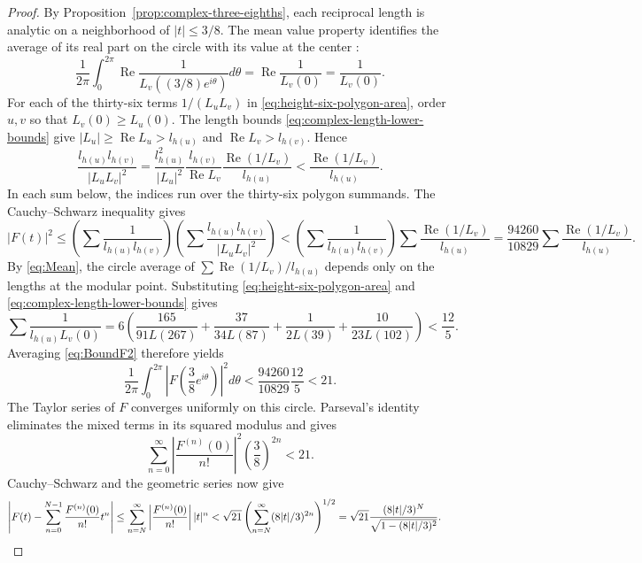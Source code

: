 \documentclass[10pt,twoside]{article}
\theoremstyle{plain}
\theoremstyle{definition}
\theoremstyle{remark}
\begin{document}
\begin{proof}
By Proposition~\ref{prop:complex-three-eighths}, each reciprocal
length is analytic on a neighborhood of $|t|\leq3/8$.
The mean value property identifies the average of its real part
on the circle with its value at the center
\cite[Corollary~7.3, p.~103]{SteinShakarchi}:
\begin{equation}
\label{eq:Mean}
\frac1{2\pi}\int_0^{2\pi}
\operatorname{Re}\frac1{L_v((3/8)e^{i\theta})}d\theta
=\operatorname{Re}\frac1{L_v(0)} = \frac1{L_v(0)}.
\end{equation}
For each of the thirty-six terms $1/(L_uL_v)$ in
\eqref{eq:height-six-polygon-area}, order $u,v$ so that
$L_v(0)\geq L_u(0)$. The length bounds \eqref{eq:complex-length-lower-bounds} give
$|L_u|\geq\operatorname{Re}L_u>l_{h(u)}$ and
$\operatorname{Re}L_v>l_{h(v)}$. Hence
$$
\frac{l_{h(u)}l_{h(v)}}{|L_uL_v|^2}
=
\frac{{l_{h(u)}^2}}{|L_u|^2}
\frac{l_{h(v)}}{\operatorname{Re}L_v}
\frac{\operatorname{Re}(1/L_v)}{l_{h(u)}}
<
\frac{\operatorname{Re}(1/L_v)}{l_{h(u)}}.
$$
In each sum below, the indices run over the thirty-six polygon
summands. The Cauchy--Schwarz inequality gives
\begin{equation}\label{eq:BoundF2}
|F(t)|^2
\leq
\left(\sum\frac1{l_{h(u)}l_{h(v)}}\right)
\left(\sum\frac{l_{h(u)}l_{h(v)}}{|L_uL_v|^2}\right)<
\left(\sum\frac1{l_{h(u)}l_{h(v)}}\right)
\sum\frac{\operatorname{Re}(1/L_v)}{l_{h(u)}}=\frac{94260}{10829}
\sum\frac{\operatorname{Re}(1/L_v)}{l_{h(u)}}.
\end{equation}
By \eqref{eq:Mean}, the circle average of
$\sum \operatorname{Re}(1/L_v)/l_{h(u)}$ depends only on the lengths
at the modular point. Substituting
\eqref{eq:height-six-polygon-area} and
\eqref{eq:complex-length-lower-bounds} gives
$$
\sum\frac1{l_{h(u)}L_v(0)}
=6\left(
\frac{165}{91L(267)}+\frac{37}{34L(87)}
+\frac1{2L(39)}+\frac{10}{23L(102)}
\right)<\frac{12}{5}.
$$
Averaging \eqref{eq:BoundF2} therefore yields
$$
\frac1{2\pi}\int_0^{2\pi}
\left|F\left(\frac38e^{i\theta}\right)\right|^2d\theta
<\frac{94260}{10829}\frac{12}{5}<21.
$$
The Taylor series of $F$ converges uniformly on this circle.
Parseval's identity eliminates the mixed terms in its squared
modulus and gives
$$
\sum_{n=0}^{\infty}
\left|\frac{F^{(n)}(0)}{n!}\right|^2
\left(\frac38\right)^{2n}<21.
$$
Cauchy--Schwarz and the geometric series now give
\begin{equation*}
\begin{aligned}
\left|F(t)-\sum_{n=0}^{N-1}\frac{F^{(n)}(0)}{n!}t^n\right|
&\leq\sum_{n=N}^{\infty}
\left|\frac{F^{(n)}(0)}{n!}\right||t|^n<\sqrt{21}
\left(\sum_{n=N}^{\infty}(8|t|/3)^{2n}\right)^{1/2}=\sqrt{21}
\frac{(8|t|/3)^N}{\sqrt{1-(8|t|/3)^2}}.
\end{aligned}
\qedhere
\end{equation*}
\end{proof}
\end{document}
